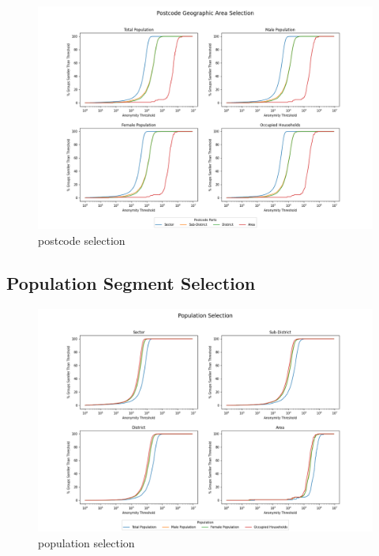 \documentclass[12pt, a4paper]{article}
\begin{document}
\begin{figure}
\includegraphics[width=1\textwidth,trim={0.1cm, 0.1cm, 0.1cm, 0.1cm},clip]{images/postode_selection.png}
\caption{postcode selection}\label{fig:postcode_selection}
\end{figure}

\subsection{Population Segment Selection}

\begin{figure}
\includegraphics[width=1\textwidth,trim={0.1cm, 0.1cm, 0.1cm, 0.1cm},clip]{images/population_selection.png}
\caption{population selection}\label{fig:population_selection}
\end{figure}
\end{document}
